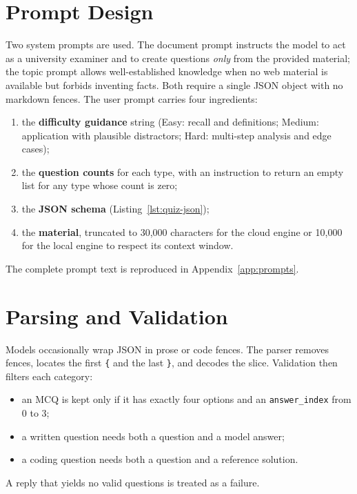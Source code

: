 \section{Prompt Design}
Two system prompts are used. The document prompt instructs the model to act as a university examiner and to create questions \textit{only} from the provided material; the topic prompt allows well-established knowledge when no web material is available but forbids inventing facts. Both require a single JSON object with no markdown fences. The user prompt carries four ingredients:
\begin{enumerate}
\item the \textbf{difficulty guidance} string (Easy: recall and definitions; Medium: application with plausible distractors; Hard: multi-step analysis and edge cases);
\item the \textbf{question counts} for each type, with an instruction to return an empty list for any type whose count is zero;
\item the \textbf{JSON schema} (Listing~\ref{lst:quiz-json});
\item the \textbf{material}, truncated to 30{,}000 characters for the cloud engine or 10{,}000 for the local engine to respect its context window.
\end{enumerate}
The complete prompt text is reproduced in Appendix~\ref{app:prompts}.

\section{Parsing and Validation}
Models occasionally wrap JSON in prose or code fences. The parser removes fences, locates the first \texttt{\{} and the last \texttt{\}}, and decodes the slice. Validation then filters each category:
\begin{itemize}
\item an MCQ is kept only if it has exactly four options and an \texttt{answer\_index} from 0 to 3;
\item a written question needs both a question and a model answer;
\item a coding question needs both a question and a reference solution.
\end{itemize}
A reply that yields no valid questions is treated as a failure.

